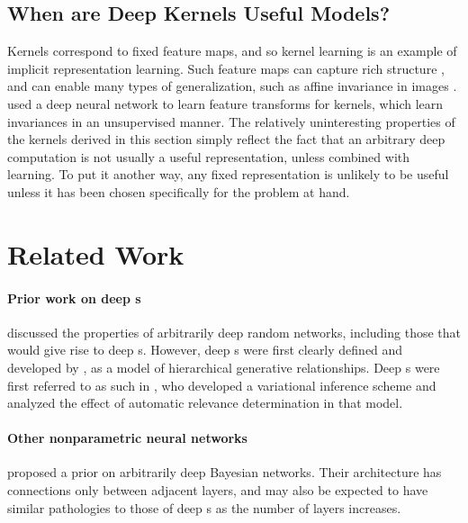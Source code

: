 \subsection{When are Deep Kernels Useful Models?}

Kernels correspond to fixed feature maps, and so kernel learning is an example of implicit representation learning. %
Such feature maps can capture rich structure \citep{DuvLloGroetal13}, and can enable many types of generalization, such as affine invariance in images \citep{kondor2008group}.
\cite{SalHin08} used a deep neural network to learn feature transforms for kernels, which learn invariances in an unsupervised manner.
The relatively uninteresting properties of the kernels derived in this section simply reflect the fact that an arbitrary deep computation is not usually a useful representation, unless combined with learning.
To put it another way, any fixed representation is unlikely to be useful unless it has been chosen specifically for the problem at hand.






\section{Related Work}

\paragraph{Prior work on deep \sgp{}s}
\citet{neal1995bayesian} discussed the properties of arbitrarily deep random networks, including those that would give rise to deep \gp{}s.
However, deep \gp{}s were first clearly defined and developed by \cite{lawrence2007hierarchical}, as a model of hierarchical generative relationships.
Deep \gp{}s were first referred to as such in \citet{damianou2012deep}, who developed a variational inference scheme and analyzed the effect of automatic relevance determination in that model.

\paragraph{Other nonparametric neural networks}
\citet{adams2010learning} proposed a prior on arbitrarily deep Bayesian networks.
Their architecture has connections only between adjacent layers, and may also be expected to have similar pathologies to those of deep \gp{}s as the number of layers increases.

